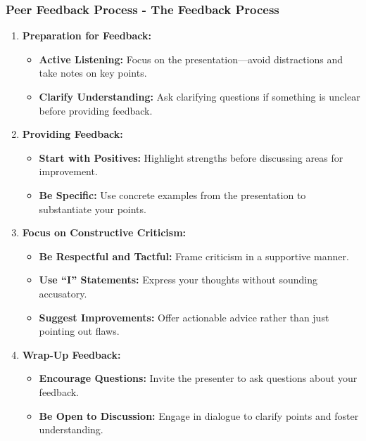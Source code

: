 \documentclass[aspectratio=169]{beamer}
\begin{document}
\begin{frame}[fragile]
    \frametitle{Peer Feedback Process - The Feedback Process}
    \begin{enumerate}
        \item \textbf{Preparation for Feedback:}
        \begin{itemize}
            \item \textbf{Active Listening:} Focus on the presentation—avoid distractions and take notes on key points.
            \item \textbf{Clarify Understanding:} Ask clarifying questions if something is unclear before providing feedback.
        \end{itemize}

        \item \textbf{Providing Feedback:}
        \begin{itemize}
            \item \textbf{Start with Positives:} Highlight strengths before discussing areas for improvement.
            \item \textbf{Be Specific:} Use concrete examples from the presentation to substantiate your points.
        \end{itemize}

        \item \textbf{Focus on Constructive Criticism:}
        \begin{itemize}
            \item \textbf{Be Respectful and Tactful:} Frame criticism in a supportive manner.
            \item \textbf{Use ``I'' Statements:} Express your thoughts without sounding accusatory.
            \item \textbf{Suggest Improvements:} Offer actionable advice rather than just pointing out flaws.
        \end{itemize}

        \item \textbf{Wrap-Up Feedback:}
        \begin{itemize}
            \item \textbf{Encourage Questions:} Invite the presenter to ask questions about your feedback.
            \item \textbf{Be Open to Discussion:} Engage in dialogue to clarify points and foster understanding.
        \end{itemize}
    \end{enumerate}
\end{frame}
\end{document}
